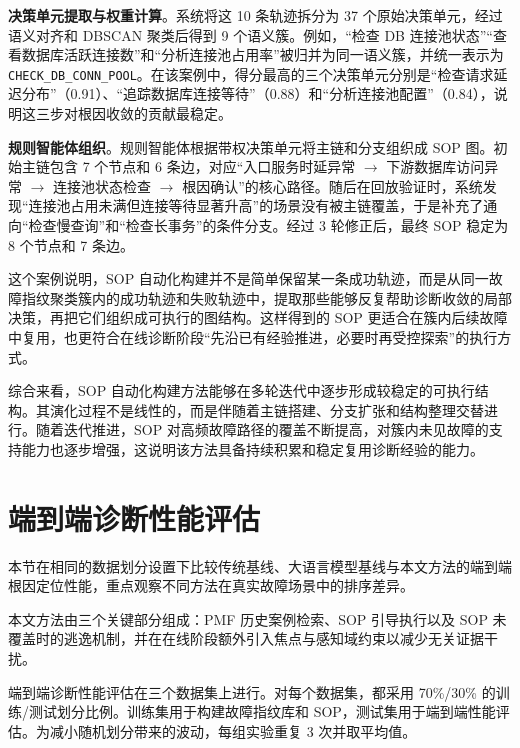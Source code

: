 \textbf{决策单元提取与权重计算}。系统将这 10 条轨迹拆分为 37 个原始决策单元，经过语义对齐和 DBSCAN 聚类后得到 9 个语义簇。例如，“检查 DB 连接池状态”“查看数据库活跃连接数”和“分析连接池占用率”被归并为同一语义簇，并统一表示为 \texttt{CHECK\_DB\_CONN\_POOL}。在该案例中，得分最高的三个决策单元分别是“检查请求延迟分布”（0.91）、“追踪数据库连接等待”（0.88）和“分析连接池配置”（0.84），说明这三步对根因收敛的贡献最稳定。

\textbf{规则智能体组织}。规则智能体根据带权决策单元将主链和分支组织成 SOP 图。初始主链包含 7 个节点和 6 条边，对应“入口服务时延异常 $\rightarrow$ 下游数据库访问异常 $\rightarrow$ 连接池状态检查 $\rightarrow$ 根因确认”的核心路径。随后在回放验证时，系统发现“连接池占用未满但连接等待显著升高”的场景没有被主链覆盖，于是补充了通向“检查慢查询”和“检查长事务”的条件分支。经过 3 轮修正后，最终 SOP 稳定为 8 个节点和 7 条边。

这个案例说明，SOP 自动化构建并不是简单保留某一条成功轨迹，而是从同一故障指纹聚类簇内的成功轨迹和失败轨迹中，提取那些能够反复帮助诊断收敛的局部决策，再把它们组织成可执行的图结构。这样得到的 SOP 更适合在簇内后续故障中复用，也更符合在线诊断阶段“先沿已有经验推进，必要时再受控探索”的执行方式。

综合来看，SOP 自动化构建方法能够在多轮迭代中逐步形成较稳定的可执行结构。其演化过程不是线性的，而是伴随着主链搭建、分支扩张和结构整理交替进行。随着迭代推进，SOP 对高频故障路径的覆盖不断提高，对簇内未见故障的支持能力也逐步增强，这说明该方法具备持续积累和稳定复用诊断经验的能力。


\section{端到端诊断性能评估}

本节在相同的数据划分设置下比较传统基线、大语言模型基线与本文方法的端到端根因定位性能，重点观察不同方法在真实故障场景中的排序差异。

本文方法由三个关键部分组成：PMF 历史案例检索、SOP 引导执行以及 SOP 未覆盖时的逃逸机制，并在在线阶段额外引入焦点与感知域约束以减少无关证据干扰。

端到端诊断性能评估在三个数据集上进行。对每个数据集，都采用 70\%/30\% 的训练/测试划分比例。训练集用于构建故障指纹库和 SOP，测试集用于端到端性能评估。为减小随机划分带来的波动，每组实验重复 3 次并取平均值。

